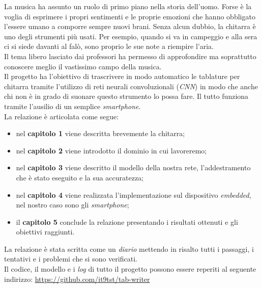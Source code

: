 La musica ha assunto un ruolo di primo piano nella storia dell'uomo. Forse è la voglia di esprimere i propri sentimenti e le proprie emozioni che hanno obbligato l'essere umano a comporre sempre nuovi brani. Senza alcun dubbio, la chitarra è uno degli strumenti più usati. Per esempio, quando si va in campeggio e alla sera ci si siede davanti al falò, sono proprio le sue note a riempire l'aria.\\ Il tema libero lasciato dai professori ha permesso di approfondire ma soprattutto conoscere meglio il vastissimo campo della musica.  \\ Il progetto ha l'obiettivo di trascrivere in modo automatico le tablature per chitarra tramite l'utilizzo di reti neurali convoluzionali (\textit{CNN}) in modo che anche chi non è in grado di suonare questo strumento lo possa fare. Il tutto funziona tramite l'ausilio di un semplice \textit{smartphone}. \\

La relazione è articolata come segue:
\begin{itemize}
	\item nel \textbf{capitolo 1} viene descritta brevemente la chitarra;
	\item nel \textbf{capitolo 2} viene introdotto il dominio in cui lavoreremo;
	\item nel \textbf{capitolo 3} viene descritto il modello della nostra rete, l'addestramento che è stato eseguito e la sua accuratezza;
	\item nel \textbf{capitolo 4} viene realizzata l'implementazione sul dispositivo \textit{embedded}, nel nostro caso sono gli \textit{smartphone};
	\item il \textbf{capitolo 5} conclude la relazione presentando i risultati ottenuti e gli obiettivi raggiunti.
\end{itemize}
La relazione è stata scritta come un \textit{diario} mettendo in risalto tutti i passaggi, i tentativi e i problemi che si sono verificati.\\
\newline
Il codice, il modello e i \textit{log} di tutto il progetto possono essere reperiti al seguente indirizzo: \href{https://github.com/it9tst/tab-writer}{https://github.com/it9tst/tab-writer} 
 